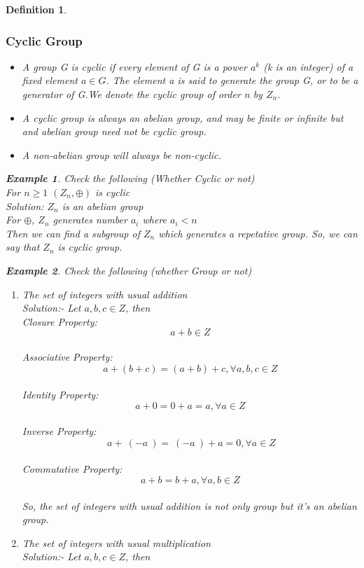 \documentclass{article}
\newtheorem{defn}{Definition} [section]
\newtheorem{ex}{Example}[section]
\begin{document}
\begin{defn}
\subsubsection{Cyclic Group}
\begin{itemize}
    \item A group G is cyclic if every element of G is a power $a^{k}$ (k is an integer) of a fixed element $a \in G$. The element a is said to generate the group G, or to be a generator of G.We denote the cyclic group of order n by $Z_n$.
    \item A cyclic group is always an abelian group, and may be finite or infinite but and abelian group need not be cyclic group.
    \item A non-abelian group will always be non-cyclic.
    
\end{itemize}
\begin{ex} Check the following (Whether Cyclic or not)
\\For $n \geq 1$ $({Z}_n,\oplus)$ is cyclic
\\Solution: $Z_n$ is an abelian group
\\ For $\oplus$, $Z_n$ generates number $a_i$ where $a_i < n$
\\ Then we can find a subgroup of $Z_n$ which generates a repetative group. So, we can say that $Z_n$ is cyclic group.
\end{ex}
\begin{ex}Check the following (whether Group or not)
\begin{enumerate}
	\item The set of integers with usual addition 
	\\ Solution:- Let $a,b,c \in Z$, then 
	\\Closure Property: $$a+b \in Z$$
	\\Associative Property: $$a+(b+c)=(a+b)+c, \forall a,b,c \in Z$$
	\\Identity Property: $$a+0=0+a=a, \forall a \in Z$$
	\\Inverse Property: $$ \ a + \ (-a\ ) =\ (-a\ ) + a = 0, \forall a \in Z$$
	\\Commutative Property: $$a+b=b+a,\forall a,b \in Z$$
	\\So, the set of integers with usual addition is not only group but it's an abelian group.\\
	\item The set of integers with usual multiplication
	\\ Solution:- Let $a,b,c \in Z$, then 

\end{enumerate}
\end{ex}
\end{defn}
\end{document}
